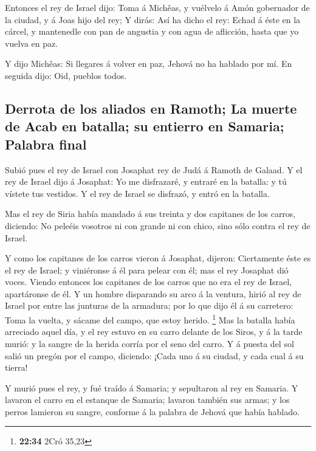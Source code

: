  Entonces el rey de Israel dijo: Toma á Michêas, y vuélvelo
á Amón gobernador de la ciudad, y á Joas hijo del rey;  Y
dirás: Así ha dicho el rey: Echad á éste en la cárcel, y mantenedle con
pan de angustia y con agua de aflicción, hasta que yo vuelva en paz.

 Y dijo Michêas: Si llegares á volver en paz, Jehová no ha
hablado por mí. En seguida dijo: Oid, pueblos todos.

\hypertarget{derrota-de-los-aliados-en-ramoth-la-muerte-de-acab-en-batalla-su-entierro-en-samaria-palabra-final}{%
\subsection{Derrota de los aliados en Ramoth; La muerte de Acab en
batalla; su entierro en Samaria; Palabra
final}\label{derrota-de-los-aliados-en-ramoth-la-muerte-de-acab-en-batalla-su-entierro-en-samaria-palabra-final}}

 Subió pues el rey de Israel con Josaphat rey de Judá á
Ramoth de Galaad.  Y el rey de Israel dijo á Josaphat: Yo
me disfrazaré, y entraré en la batalla: y tú vístete tus vestidos. Y el
rey de Israel se disfrazó, y entró en la batalla.

 Mas el rey de Siria había mandado á sus treinta y dos
capitanes de los carros, diciendo: No peleéis vosotros ni con grande ni
con chico, sino sólo contra el rey de Israel.

 Y como los capitanes de los carros vieron á Josaphat,
dijeron: Ciertamente éste es el rey de Israel; y viniéronse á él para
pelear con él; mas el rey Josaphat dió voces.  Viendo
entonces los capitanes de los carros que no era el rey de Israel,
apartáronse de él.  Y un hombre disparando su arco á la
ventura, hirió al rey de Israel por entre las junturas de la armadura;
por lo que dijo él á su carretero: Toma la vuelta, y sácame del campo,
que estoy herido. \footnote{\textbf{22:34} 2Cró 35,23}  Mas
la batalla había arreciado aquel día, y el rey estuvo en su carro
delante de los Siros, y á la tarde murió: y la sangre de la herida
corría por el seno del carro.  Y á puesta del sol salió un
pregón por el campo, diciendo: ¡Cada uno á su ciudad, y cada cual á su
tierra!

 Y murió pues el rey, y fué traído á Samaria; y sepultaron
al rey en Samaria.  Y lavaron el carro en el estanque de
Samaria; lavaron también sus armas; y los perros lamieron su sangre,
conforme á la palabra de Jehová que había hablado.

